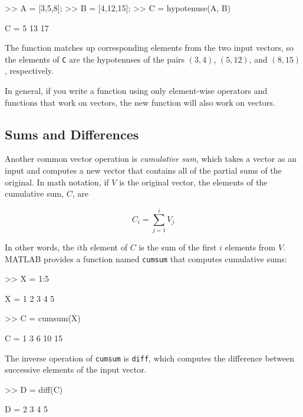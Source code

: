 
\begin{code}
>> A = [3,5,8];
>> B = [4,12,15];
>> C = hypotenuse(A, B)

C = 5    13    17
\end{code}

The function matches up corresponding elements from the two
input vectors, so the elements of \lstinline{C} are the hypotenuses of
the pairs $(3,4)$, $(5,12)$, and $(8,15)$, respectively.

In general, if you write a function using only element-wise
operators and functions that work on vectors, the new
function will also work on vectors.


\subsection{Sums and Differences}

Another common vector operation is \emph{cumulative sum}, which takes a vector as an input and computes a new vector that contains all of the partial sums of the original.  In math notation, if $V$ is the original vector, the elements of the cumulative sum, $C$, are


\begin{equation*}
C_i = \sum_{j=1}^i V_j
\end{equation*}

In other words, the $i$th element of $C$ is the sum of the first
$i$ elements from $V$.  MATLAB provides a function named \lstinline{cumsum} that computes cumulative sums:


\begin{code}
>> X = 1:5

X = 1     2     3     4     5

>> C = cumsum(X)

C = 1     3     6    10    15
\end{code}

The inverse operation of \lstinline{cumsum} is \lstinline{diff}, which computes
the difference between successive elements of the input vector.


\begin{code}
>> D = diff(C)

D = 2     3     4     5
\end{code}

